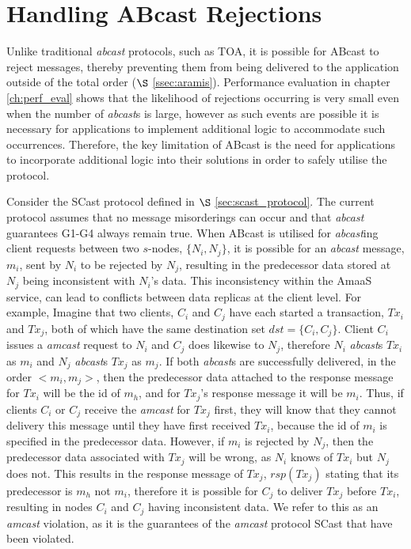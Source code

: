 \section{Handling ABcast Rejections}
 Unlike traditional \emph{abcast} protocols, such as TOA, it is possible for \textsf{ABcast} to reject messages, thereby preventing them from being delivered to the application outside of the total order ($\S$ \ref{ssec:aramis}).  Performance evaluation in chapter \ref{ch:perf_eval} shows that the likelihood of rejections occurring is very small even when the number of \emph{abcast}s is large, however as such events are possible it is necessary for applications to implement additional logic to accommodate such occurrences.  Therefore, the key limitation of \textsf{ABcast} is the need for applications to incorporate additional logic into their solutions in order to safely utilise the protocol.   
 
Consider the \textsf{SCast} protocol defined in $\S$ \ref{sec:scast_protocol}.  The current protocol assumes that no message misorderings can occur and that \emph{abcast} guarantees G1-G4 always remain true.  When \textsf{ABcast} is utilised for \emph{abcast}ing client requests between two $s$-nodes, $\{N_i, N_j\}$, it is possible for an \emph{abcast} message, $m_i$, sent by $N_i$ to be rejected by $N_j$, resulting in the predecessor data stored at $N_j$ being inconsistent with $N_i$'s data.  This inconsistency within the \textsf{AmaaS} service, can lead to conflicts between data replicas at the client level.  For example, Imagine that two clients, $C_i$ and $C_j$ have each started a transaction, $Tx_i$ and $Tx_j$, both of which have the same destination set $dst=\{C_i, C_j\}$.  Client $C_i$ issues a \emph{amcast} request to $N_i$ and $C_j$ does likewise to $N_j$, therefore $N_i$ \emph{abcast}s $Tx_i$ as $m_i$ and $N_j$ \emph{abcast}s $Tx_j$ as $m_j$.  If both \emph{abcast}s are successfully delivered, in the order $<m_i, m_j>$, then the predecessor data attached to the response message for $Tx_i$ will be the id of $m_h$, and for $Tx_j$'s response message it will be $m_i$.  Thus, if clients $C_i$ or $C_j$ receive the \emph{amcast} for $Tx_j$ first, they will know that they cannot delivery this message until they have first received $Tx_i$, because the id of $m_i$ is specified in the predecessor data.  However, if $m_i$ is rejected by $N_j$, then the predecessor data associated with $Tx_j$ will be wrong, as $N_i$ knows of $Tx_i$ but $N_j$ does not.  This results in the response message of $Tx_j$, $rsp(Tx_j)$ stating that its predecessor is $m_h$ not $m_i$, therefore it is possible for $C_j$ to deliver $Tx_j$ before $Tx_i$, resulting in nodes $C_i$ and $C_j$ having inconsistent data.  We refer to this as an \emph{amcast} violation, as it is the guarantees of the \emph{amcast} protocol \textsf{SCast} that have been violated.  


